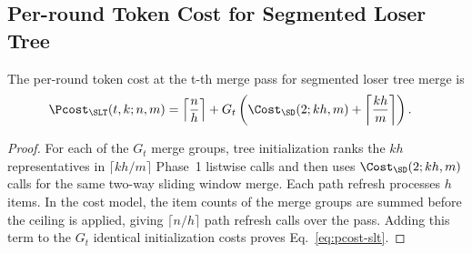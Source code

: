 \subsection{Per-round Token Cost for Segmented Loser Tree}

\begin{proposition}
The per-round token cost at the t-th merge pass for segmented loser tree merge is
\begin{align}
  \Pcost_{\SLT}(t,k;n,m)
  &=\left\lceil\frac{n}{h}\right\rceil
    +G_t\left(
      \Cost_{\SD}(2;kh,m)
      +\left\lceil\frac{kh}{m}\right\rceil
    \right).
\end{align}
\end{proposition}

\begin{proof}
For each of the $G_t$ merge groups, tree initialization ranks the $kh$ representatives in $\lceil kh/m\rceil$ Phase~1 listwise calls and then uses $\Cost_{\SD}(2;kh,m)$ calls for the same two-way sliding window merge. Each path refresh processes $h$ items. In the cost model, the item counts of the merge groups are summed before the ceiling is applied, giving $\lceil n/h\rceil$ path refresh calls over the pass. Adding this term to the $G_t$ identical initialization costs proves Eq.~\eqref{eq:pcost-slt}.
\end{proof}
